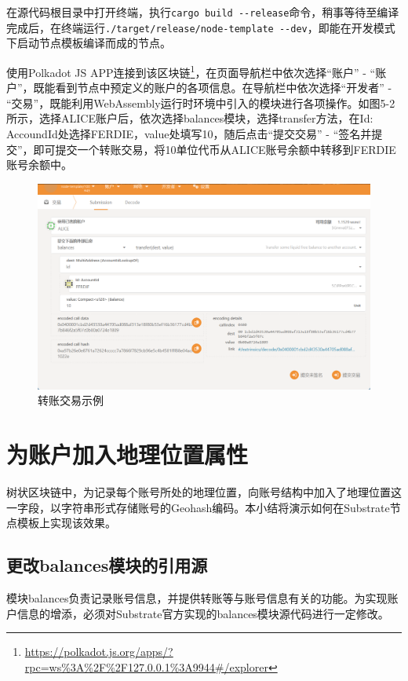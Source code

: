 在源代码根目录中打开终端，执行\verb|cargo build --release|命令，稍事等待至编译完成后，在终端运行\verb|./target/release/node-template --dev|，即能在开发模式下启动节点模板编译而成的节点。

使用Polkadot JS APP连接到该区块链\footnote{\url{https://polkadot.js.org/apps/?rpc=ws\%3A\%2F\%2F127.0.0.1\%3A9944\#/explorer}}，在页面导航栏中依次选择“账户” - “账户”，既能看到节点中预定义的账户的各项信息。在导航栏中依次选择“开发者” - “交易”，既能利用WebAssembly运行时环境中引入的模块进行各项操作。如图5-2所示，选择ALICE账户后，依次选择balances模块，选择transfer方法，在Id: AccoundId处选择FERDIE，value处填写10，随后点击“提交交易” - “签名并提交”，即可提交一个转账交易，将10单位代币从ALICE账号余额中转移到FERDIE账号余额中。

\begin{figure}[htbp]
    \centering
    \includegraphics[width=\textwidth]{images/substrateTransfer.png}
    \caption{转账交易示例}\label{转账交易示例} %
\end{figure}

\section{为账户加入地理位置属性}

树状区块链中，为记录每个账号所处的地理位置，向账号结构中加入了地理位置这一字段，以字符串形式存储账号的Geohash编码。本小结将演示如何在Substrate节点模板上实现该效果。

\subsection{更改balances模块的引用源}

模块balances负责记录账号信息，并提供转账等与账号信息有关的功能。为实现账户信息的增添，必须对Substrate官方实现的balances模块源代码进行一定修改。

